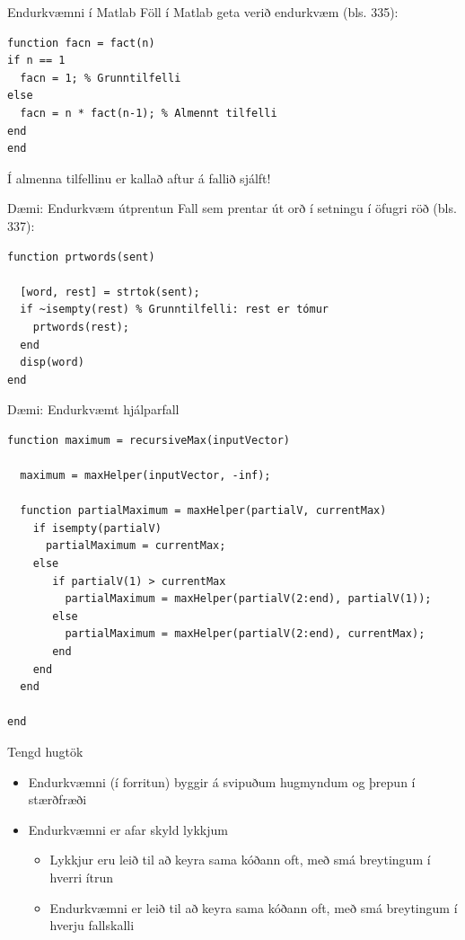 \documentclass{beamer}
\begin{document}
\begin{frame}[fragile]{Endurkvæmni í Matlab}
Föll í Matlab geta verið endurkvæm (bls. 335):
\begin{verbatim}
function facn = fact(n)
if n == 1
  facn = 1; % Grunntilfelli
else
  facn = n * fact(n-1); % Almennt tilfelli
end
end
\end{verbatim}
Í almenna tilfellinu er kallað aftur á fallið sjálft!
\end{frame}

\begin{frame}[fragile]{Dæmi: Endurkvæm útprentun}
Fall sem prentar út orð í setningu í öfugri röð (bls. 337):
\begin{verbatim}
function prtwords(sent)

  [word, rest] = strtok(sent);
  if ~isempty(rest) % Grunntilfelli: rest er tómur
    prtwords(rest);
  end
  disp(word)
end
\end{verbatim}
\end{frame}

\begin{frame}[fragile]{Dæmi: Endurkvæmt hjálparfall}
\vspace{\baselineskip}
\begin{verbatim}
function maximum = recursiveMax(inputVector)
  
  maximum = maxHelper(inputVector, -inf);
  
  function partialMaximum = maxHelper(partialV, currentMax)
    if isempty(partialV)
      partialMaximum = currentMax;
    else
       if partialV(1) > currentMax
         partialMaximum = maxHelper(partialV(2:end), partialV(1));
       else
         partialMaximum = maxHelper(partialV(2:end), currentMax);
       end
    end
  end
  
end
\end{verbatim}

\end{frame}



\begin{frame}{Tengd hugtök}
\begin{itemize}
 \item Endurkvæmni (í forritun) byggir á svipuðum hugmyndum og þrepun í stærðfræði
 \item Endurkvæmni er afar skyld lykkjum
 \begin{itemize}
  \item Lykkjur eru leið til að keyra sama kóðann oft, með smá breytingum í hverri ítrun
  \item Endurkvæmni er leið til að keyra sama kóðann oft, með smá breytingum í hverju fallskalli
 \end{itemize}
\end{itemize}

\end{frame}
\end{document}
